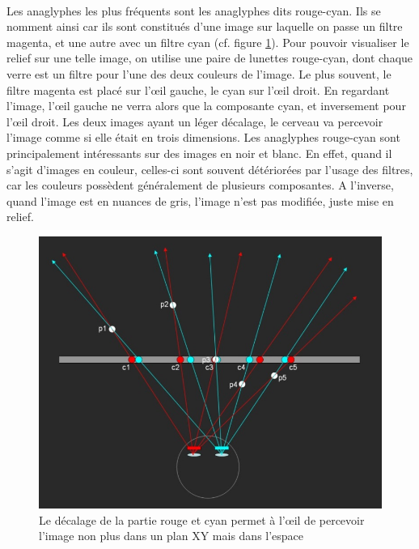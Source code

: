 \paragraph{}
	Les anaglyphes les plus fréquents sont les anaglyphes dits rouge-cyan. Ils se nomment ainsi car ils sont constitués d’une image sur laquelle on passe un filtre magenta, et une autre avec un filtre cyan (cf. figure \ref{fig:anaglyph}). Pour pouvoir visualiser le relief sur une telle image, on utilise une paire de lunettes rouge-cyan, dont chaque verre est un filtre pour l’une des deux couleurs de l’image. Le plus souvent, le filtre magenta est placé sur l’œil gauche, le cyan sur l’œil droit. En regardant l’image, l’œil gauche ne verra alors que la composante cyan, et inversement pour l’œil droit. Les deux images ayant un léger décalage, le cerveau va percevoir l’image comme si elle était en trois dimensions. Les anaglyphes rouge-cyan sont principalement intéressants sur des images en noir et blanc. En effet, quand il s’agit d’images en couleur, celles-ci sont souvent détériorées par l’usage des filtres, car les couleurs possèdent généralement de plusieurs composantes. A l’inverse, quand l’image est en nuances de gris, l’image n’est pas modifiée, juste mise en relief.

\begin{figure}[h]
		\centering
		\includegraphics[scale=0.7]{anaglyph.png}
		\caption{\label{fig:anaglyph} Le décalage de la partie rouge et cyan permet à l’œil de percevoir l’image non plus dans un plan XY mais dans l’espace \protect \footnotemark }
\end{figure}

